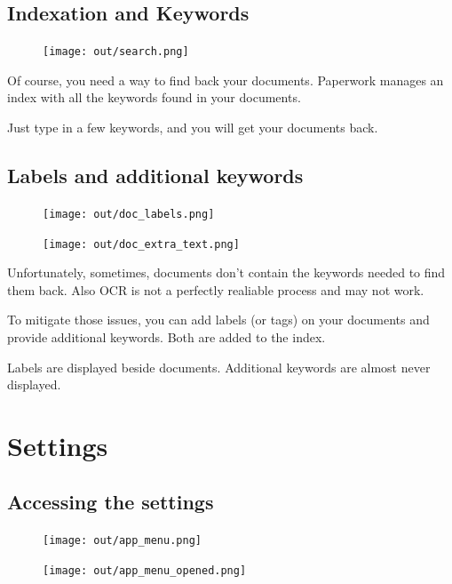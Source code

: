 \documentclass[10pt,a4paper]{article}
\begin{document}
\subsection{Indexation and Keywords}

\begin{figure}[H]
	\texttt{[image: out/search.png]}
\end{figure}

Of course, you need a way to find back your documents. Paperwork manages an
index with all the keywords found in your documents.

Just type in a few keywords, and you will get your documents back.


\subsection{Labels and additional keywords}

\begin{figure}[H]
	\centering
	\begin{minipage}{.5\textwidth}
		\centering
		\texttt{[image: out/doc\_labels.png]}
	\end{minipage}%
	\begin{minipage}{.5\textwidth}
		\centering
		\texttt{[image: out/doc\_extra\_text.png]}
	\end{minipage}
\end{figure}

Unfortunately, sometimes, documents don't contain the keywords needed to find
them back. Also OCR is not a perfectly realiable process and may not work.

To mitigate those issues, you can add labels (or tags) on your documents and
provide additional keywords. Both are added to the index.

Labels are displayed beside documents. Additional keywords are almost never
displayed.


\section{Settings}

\subsection{Accessing the settings}

\begin{figure}[H]
	\centering
	\begin{minipage}{.5\textwidth}
		\centering
		\texttt{[image: out/app\_menu.png]}
	\end{minipage}%
	\begin{minipage}{.5\textwidth}
		\centering
		\texttt{[image: out/app\_menu\_opened.png]}
	\end{minipage}
\end{figure}
\end{document}
